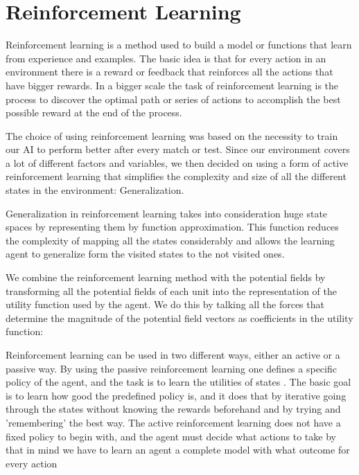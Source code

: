 \section{Reinforcement Learning}

	Reinforcement learning is a method used to build a model or functions that learn from experience and examples. The basic idea is that for every action in an environment there is a reward or feedback that reinforces all the actions that have bigger rewards. In a bigger scale the task of reinforcement learning is the process to discover the optimal path or series of actions to accomplish the best possible reward at the end of the process. 

	The choice of using reinforcement learning was based on the necessity to train our AI to perform better after every match or test. Since our environment covers a lot of different factors and variables, we then decided on using a form of active reinforcement learning that simplifies the complexity and size of all the different states in the environment: Generalization. 

	Generalization in reinforcement learning takes into consideration huge state spaces by representing them by function approximation. This function reduces the complexity of mapping all the states considerably and allows the learning agent to generalize form the visited states to the not visited ones. 

	We combine the reinforcement learning method with the potential fields by transforming all the potential fields of each unit into the representation of the utility function used by the agent. We do this by talking all the forces that determine the magnitude of the potential field vectors as coefficients in the utility function:
	
	
	Reinforcement learning can be used in two different ways, either an active or a passive way. By using the passive reinforcement learning one defines a specific policy of the agent, and the task is to learn the utilities of states \cite{rl}. The basic goal is to learn how good the predefined policy is, and it does that by iterative going through the states without knowing the rewards beforehand and by trying and 'remembering' the best way. The active reinforcement learning does not have a fixed policy to begin with, and the agent must decide what actions to take \cite[p771]{rl} by that in mind we have to learn an agent a complete model with what outcome for every action

